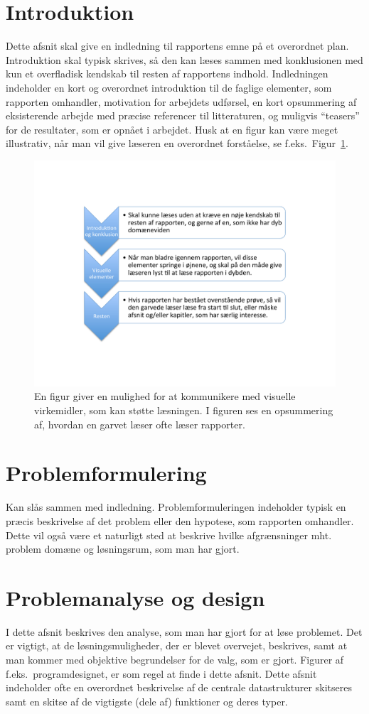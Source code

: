\documentclass[a4paper]{article}
\begin{document}
\section{Introduktion}
Dette afsnit skal give en indledning til rapportens emne på et overordnet plan. Introduktion skal typisk skrives, så den kan læses sammen med konklusionen med kun et overfladisk kendskab til resten af rapportens indhold. Indledningen indeholder en kort og overordnet introduktion til de faglige elementer, som rapporten omhandler, motivation for arbejdets udførsel, en kort opsummering af eksisterende arbejde med præcise referencer til litteraturen, og muligvis "`teasers"' for de resultater, som er opnået i arbejdet. Husk at en figur kan være meget illustrativ, når man vil give læseren en overordnet forståelse, se f.eks.\ Figur~\ref{fig:eksempel}.
\begin{figure}
  \centering
  \includegraphics[width=0.6\linewidth]{Reading} %
  \caption{En figur giver en mulighed for at kommunikere med visuelle virkemidler, som kan støtte læsningen. I figuren ses en opsummering af, hvordan en garvet læser ofte læser rapporter.}
  \label{fig:eksempel}
\end{figure}

\section{Problemformulering}
Kan slås sammen med indledning. Problemformuleringen indeholder typisk en præcis beskrivelse af det problem eller den hypotese, som rapporten omhandler. Dette vil også være et naturligt sted at beskrive hvilke afgrænsninger mht. problem domæne og løsningsrum, som man har gjort.

\section{Problemanalyse og design}
I dette afsnit beskrives den analyse, som man har gjort for at løse problemet. Det er vigtigt, at de løsningsmuligheder, der er blevet overvejet, beskrives, samt at man kommer med objektive begrundelser for de valg, som er gjort. Figurer af f.eks.\ programdesignet, er som regel at finde i dette afsnit. Dette afsnit indeholder ofte en overordnet beskrivelse af de centrale datastrukturer skitseres samt en skitse af de vigtigste (dele af) funktioner og deres typer.
\end{document}
